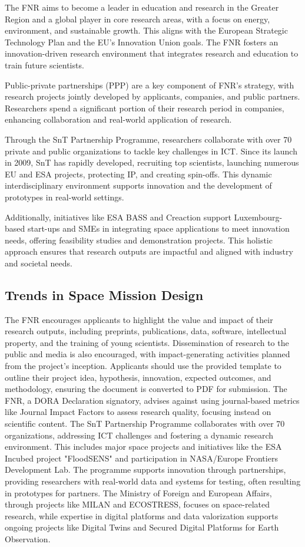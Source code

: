 \documentclass[12pt]{article}
\begin{document}
The FNR aims to become a leader in education and research in the Greater Region and a global player in core research areas, with a focus on energy, environment, and sustainable growth. This aligns with the European Strategic Technology Plan and the EU's Innovation Union goals. The FNR fosters an innovation-driven research environment that integrates research and education to train future scientists.

Public-private partnerships (PPP) are a key component of FNR's strategy, with research projects jointly developed by applicants, companies, and public partners. Researchers spend a significant portion of their research period in companies, enhancing collaboration and real-world application of research.

Through the SnT Partnership Programme, researchers collaborate with over 70 private and public organizations to tackle key challenges in ICT. Since its launch in 2009, SnT has rapidly developed, recruiting top scientists, launching numerous EU and ESA projects, protecting IP, and creating spin-offs. This dynamic interdisciplinary environment supports innovation and the development of prototypes in real-world settings.

Additionally, initiatives like ESA BASS and Creaction support Luxembourg-based start-ups and SMEs in integrating space applications to meet innovation needs, offering feasibility studies and demonstration projects. This holistic approach ensures that research outputs are impactful and aligned with industry and societal needs.

\subsection{Trends in Space Mission Design}

The FNR encourages applicants to highlight the value and impact of their research outputs, including preprints, publications, data, software, intellectual property, and the training of young scientists. Dissemination of research to the public and media is also encouraged, with impact-generating activities planned from the project's inception. Applicants should use the provided template to outline their project idea, hypothesis, innovation, expected outcomes, and methodology, ensuring the document is converted to PDF for submission. The FNR, a DORA Declaration signatory, advises against using journal-based metrics like Journal Impact Factors to assess research quality, focusing instead on scientific content. The SnT Partnership Programme collaborates with over 70 organizations, addressing ICT challenges and fostering a dynamic research environment. This includes major space projects and initiatives like the ESA Incubed project "FloodSENS" and participation in NASA/Europe Frontiers Development Lab. The programme supports innovation through partnerships, providing researchers with real-world data and systems for testing, often resulting in prototypes for partners. The Ministry of Foreign and European Affairs, through projects like MILAN and ECOSTRESS, focuses on space-related research, while expertise in digital platforms and data valorization supports ongoing projects like Digital Twins and Secured Digital Platforms for Earth Observation.
\end{document}
